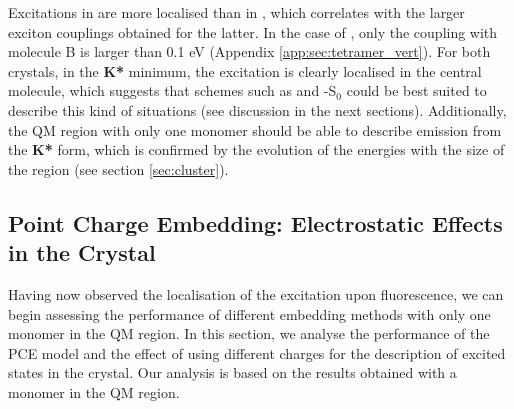 Excitations in \HC{} are more localised than in \HCC{}, which correlates with the larger exciton couplings obtained for the latter.\cite{Dommett2017c} In the case of \HC{}, only the coupling with molecule B is larger than 0.1 eV (Appendix \ref{app:sec:tetramer_vert}). For both crystals, in the \textbf{K*} minimum, the excitation is clearly localised in the central molecule, which suggests that schemes such as \EEC{} and \SCEEC{}-S$_0$ could be best suited to describe this kind of situations (see discussion in the next sections). Additionally, the QM region with only one monomer should be able to describe emission from the \textbf{K*} form, which is confirmed by the evolution of the energies with the size of the region (see section \ref{sec:cluster}).

\subsection{Point Charge Embedding: Electrostatic Effects in the Crystal}
\label{sec:PCE}

Having now observed the localisation of the excitation upon fluorescence, we can begin assessing the performance of different embedding methods with only one monomer in the QM region. In this section, we analyse the performance of the PCE model and the effect of using different charges for the description of excited states in the \HC{} crystal. Our analysis is based on the results obtained with a monomer in the QM region. 

